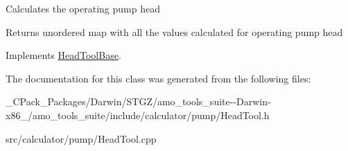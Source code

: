 Calculates the operating pump head

\begin{DoxyReturn}{Returns}
unordered map with all the values calculated for operating pump head 
\end{DoxyReturn}


Implements \hyperlink{class_head_tool_base_ab8df8f908827ce45dc5e769ea0e10f0b}{Head\+Tool\+Base}.



The documentation for this class was generated from the following files\+:\begin{DoxyCompactItemize}
\item 
\+\_\+\+C\+Pack\+\_\+\+Packages/\+Darwin/\+S\+T\+G\+Z/amo\+\_\+tools\+\_\+suite-\/-\/\+Darwin-\/x86\+\_/amo\+\_\+tools\+\_\+suite/include/calculator/pump/Head\+Tool.\+h\item 
src/calculator/pump/Head\+Tool.\+cpp\end{DoxyCompactItemize}
